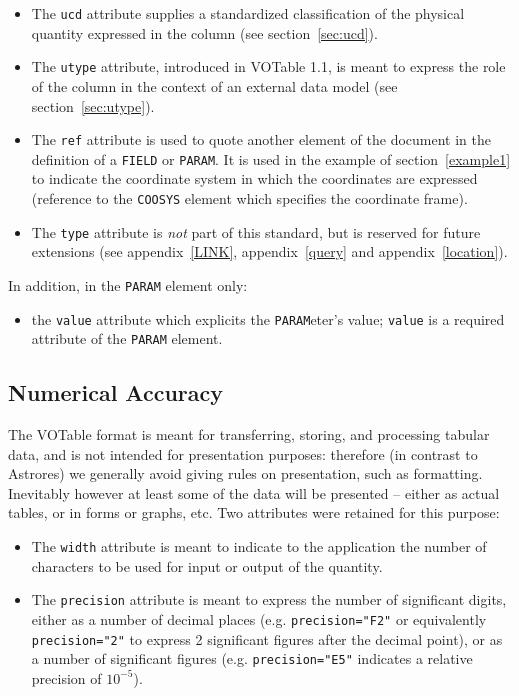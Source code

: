 \documentclass[11pt,a4paper]{ivoa}
\def\Aref#1{section~\ref{#1}}
\def\Arefx#1{appendix~\ref{#1}}
\let\fg=\color
\def\attr#1{{\tt{\fg{DarkRed}#1}}}
\def\elem#1{{\tt{\fg{DarkRed}#1}}}
\def\attrval#1#2{{\tt{\fg{DarkRed}#1}="{\fg{DarkPurple}#2}"}}
\begin{document}
\begin{itemize}
\item   The \attr{ucd} attribute supplies a standardized classification
        of the physical quantity expressed in the column
        (see \Aref{sec:ucd}).

\item   The \attr{utype} attribute, introduced in VOTable 1.1, is meant
        to express the role of the column in the context of an external
        data model (see \Aref{sec:utype}).

\item   The \attr{ref} attribute is used to quote another element of
        the document in the definition of a \elem{FIELD} or \elem{PARAM}.
        It is used in the example of \Aref{example1}
        to indicate the coordinate system in which the coordinates
        are expressed
        (reference to the \elem{COOSYS} element which specifies the
        coordinate frame).

\item   The \attr{type} attribute is {\em not} part of this standard,
        but is reserved for future extensions (see
        \Arefx{LINK},
        \Arefx{query} and
        \Arefx{location}).

\end{itemize}

In addition, in the \elem{PARAM} element only:
\begin{itemize}
\item   the \attr{value} attribute which explicits the \elem{PARAM}eter's
        value; \attr{value} is a required attribute of the \elem{PARAM}
        element.
\end{itemize}

\subsection{Numerical Accuracy}
\label{sec:form}


The VOTable format is meant for transferring, storing, and
processing tabular data, and is not intended for presentation
purposes: therefore (in contrast to Astrores) we generally avoid
giving rules on presentation, such as formatting.
Inevitably however at least some of the data will be presented --
either as actual tables,  or in forms or graphs, etc.
Two attributes were retained for this purpose:

\begin{itemize}
\item   The {\attr{width}} attribute %
        is meant to indicate to the application
        the number of characters to be used for input
        or output of the quantity.

\item   The \attr{precision} attribute is meant to express the
        number of significant digits, either as a number of
        decimal places (e.g. \attrval{precision}{F2} or equivalently
        \attrval{precision}{2} to express 2 significant figures
        after the decimal point), or as a number of significant figures
        (e.g. \attrval{precision}{E5} indicates a relative precision
        of $10^{-5}$).
\end{itemize}
\end{document}
